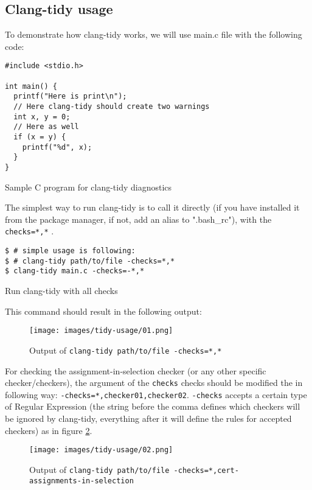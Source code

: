 \subsection{Clang-tidy usage}

To demonstrate how clang-tidy works, we will use main.c file with the following code:

\begin{listing}[h]
\begin{verbatim}
#include <stdio.h>

int main() {
  printf("Here is print\n");
  // Here clang-tidy should create two warnings
  int x, y = 0;
  // Here as well
  if (x = y) {
    printf("%d", x);
  }
}
\end{verbatim}
\caption{Sample C program for clang-tidy diagnostics}
\label{code:sample-c-usr}
\end{listing}


The simplest way to run clang-tidy is to call it directly (if you have installed it from the package manager, if not, add an alias to ".bash\_rc"), with the \lstinline{checks=*,*} . 

\begin{listing}[h]
\begin{verbatim}
$ # simple usage is following:
$ # clang-tidy path/to/file -checks=*,*
$ clang-tidy main.c -checks=-*,*
\end{verbatim}
\caption{Run clang-tidy with all checks}
\label{code:run-checks-all}
\end{listing}

This command should result in the following output: 

\begin{figure}[H]
    \centering
    \caption{Output of \lstinline{clang-tidy path/to/file -checks=*,*}}
    \texttt{[image: images/tidy-usage/01.png]}
    \label{fig:clang-tidy-usage-01}
\end{figure}

For checking the assignment-in-selection checker (or any other specific checker/checkers), the argument of the \lstinline{checks} checks should be modified the in following way: \lstinline{-checks=*,checker01,checker02}. \lstinline{-checks} accepts a certain type of Regular Expression (the string before the comma defines which checkers will be ignored by clang-tidy, everything after it will define the rules for accepted checkers) as in figure \ref{fig:clang-tidy-usage-02}.

\begin{figure}[H]
    \centering
    \caption{Output of \lstinline{clang-tidy path/to/file -checks=*,cert-assignments-in-selection}}
    \texttt{[image: images/tidy-usage/02.png]}
    \label{fig:clang-tidy-usage-02}
\end{figure}

